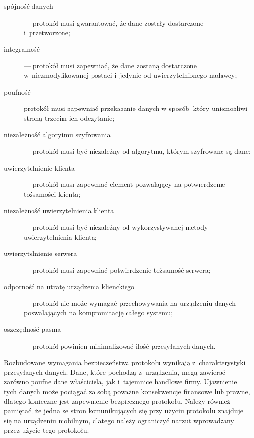 \begin{description}
\item[spójność danych] --- protokół musi gwarantować, że dane zostały
  dostarczone i~przetworzone;
\item[integralność] ---  protokół musi zapewniać, że dane zostaną
  dostarczone w~niezmodyfikowanej postaci i~jedynie od
  uwierzytelnionego nadawcy;
\item[poufność] protokół musi zapewniać przekazanie danych w sposób,
  który uniemożliwi stroną trzecim ich odczytanie;
\item[niezależność algorytmu szyfrowania] ---  protokół musi być niezależny
  od algorytmu, którym szyfrowane są dane;
\item[uwierzytelnienie klienta] ---  protokół musi zapewniać element
  pozwalający na potwierdzenie tożsamości klienta;
\item[niezależność uwierzytelnienia klienta] --- protokół musi być
  niezależny od wykorzystywanej metody uwierzytelnienia klienta;
\item[uwierzytelnienie serwera] --- protokół musi zapewniać potwierdzenie
  tożsamość serwera;
\item[odporność na utratę urządzenia klienckiego] --- protokół nie może
  wymagać przechowywania na urządzeniu danych pozwalających na
  kompromitację całego systemu;
\item[oszczędność pasma] --- protokół powinien minimalizować ilość
  przesyłanych danych.
\end{description}

Rozbudowane wymagania bezpieczeństwa protokołu wynikają
z~charakterystyki przesyłanych danych. Dane, które pochodzą
z~urządzenia, mogą zawierać zarówno poufne dane właściciela, jak
i~tajemnice handlowe firmy. Ujawnienie tych danych może pociągać za
sobą poważne konsekwencje finansowe lub prawne, dlatego konieczne jest
zapewnienie bezpiecznego protokołu. Należy również pamiętać, że jedna
ze stron komunikujących się przy użyciu protokołu znajduje się na
urządzeniu mobilnym, dlatego należy ograniczyć narzut wprowadzany
przez użycie tego protokołu.

